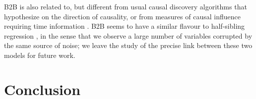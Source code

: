 \documentclass{article}
\begin{document}
B2B is also related to, but different from usual causal discovery algorithms \citep{peters2017elements} that hypothesize on the direction of causality, or from measures of causal influence requiring time information \citep{granger1969investigating, janzing2013quantifying}.
%
B2B seems to have a similar flavour to half-sibling regression \citep{scholkopf2016modeling}, in the sense that we observe a large number of variables corrupted by the same source of noise; we leave the study of the precise link between these two models for future work.


\section{Conclusion}


\clearpage
\newpage




% 

%


\end{document}
